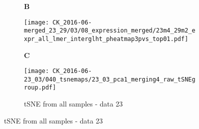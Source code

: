 \documentclass[a4paper, 12pt]{article}
\begin{document}
\begin{figure}[!thb]
\centering

    \caption{Global differential marker expression - data 23 + 29}
    \begin{subfigure}[t]{0.02\textwidth}
    \vskip 0pt
        \textbf{\textsf{\normalsize B}}
    \end{subfigure}
    \begin{subfigure}[t]{0.9\textwidth}
    \vskip 0pt
    \caption{}
        \texttt{[image: CK\_2016-06-merged\_23\_29/03/08\_expression\_merged/23m4\_29m2\_expr\_all\_lmer\_interglht\_pheatmap3pvs\_top01.pdf]}
    \end{subfigure}


\end{figure}



\begin{figure}[!thb]
\centering

        \caption{}
    \begin{subfigure}[t]{0.02\textwidth}
    \vskip 0pt
        \textbf{\textsf{\normalsize C}}
    \end{subfigure}
    \begin{subfigure}[t]{0.97\textwidth}
    \vskip 0pt
        \caption{tSNE from all samples - data 23}
        \texttt{[image: CK\_2016-06-23\_03/040\_tsnemaps/23\_03\_pca1\_merging4\_raw\_tSNEgroup.pdf]}
    \end{subfigure}
    
\end{figure}
\end{document}

